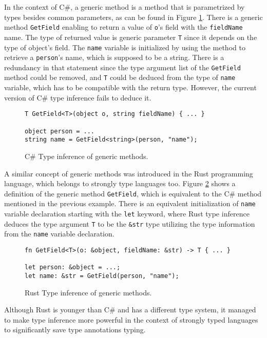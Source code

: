 In the context of C\#, a generic method is a method that is parametrized by types besides common parameters, as can be found in Figure \ref{img03:csharp_gen_meth}.
There is a generic method \texttt{GetField} enabling to return a value of \texttt{o}'s field with the \texttt{fieldName} name.
The type of returned value is generic parameter \texttt{T} since it depends on the type of object's field.
The \texttt{name} variable is initialized by using the method to retrieve a \texttt{person}'s name, which is supposed to be a string.
There is a redundancy in that statement since the type argument list of the \texttt{GetField} method could be removed, and \texttt{T} could be deduced from the type of \texttt{name} variable, which has to be compatible with the return type.
However, the current version of C\# type inference fails to deduce it.
\begin{figure}
\begin{lstlisting}[style=csharp]
T GetField<T>(object o, string fieldName) { ... }

object person = ...
string name = GetField<string>(person, "name");
\end{lstlisting}
\caption{C\# Type inference of generic methods.}
\label{img03:csharp_gen_meth}
\end{figure}
\par
A similar concept of generic methods was introduced in the Rust \cite{online:rust} programming language, which belongs to strongly type languages too.
Figure \ref{img04:rust_gen_meth} shows a definition of the generic method \texttt{GetField}, which is equivalent to the C\# method mentioned in the previous example.
There is an equivalent initialization of \texttt{name} variable declaration starting with the \texttt{let} keyword, where Rust type inference deduces the type argument \texttt{T} to be the \texttt{\&str} type utilizing the type information from the \texttt{name} variable declaration.
\begin{figure}[h]
\begin{lstlisting}[style=csharp]
fn GetField<T>(o: &object, fieldName: &str) -> T { ... }

let person: &object = ...;
let name: &str = GetField(person, "name");
\end{lstlisting}
\caption{Rust Type inference of generic methods.}
\label{img04:rust_gen_meth}
\end{figure}
\par
Although Rust is younger than C\# and has a different type system, it managed to make type inference more powerful in the context of strongly typed languages to significantly save type annotations typing.
